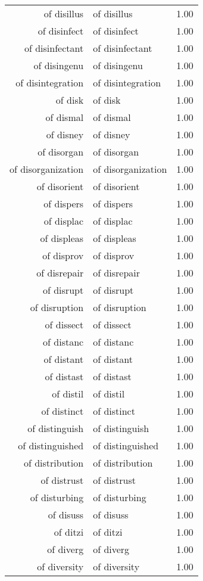 \begin{table}[ht]
\begin{tabular}{rlr}
  of disillus & of disillus & 1.00 \\ 
  of disinfect & of disinfect & 1.00 \\ 
  of disinfectant & of disinfectant & 1.00 \\ 
  of disingenu & of disingenu & 1.00 \\ 
  of disintegration & of disintegration & 1.00 \\ 
  of disk & of disk & 1.00 \\ 
  of dismal & of dismal & 1.00 \\ 
  of disney & of disney & 1.00 \\ 
  of disorgan & of disorgan & 1.00 \\ 
  of disorganization & of disorganization & 1.00 \\ 
  of disorient & of disorient & 1.00 \\ 
  of dispers & of dispers & 1.00 \\ 
  of displac & of displac & 1.00 \\ 
  of displeas & of displeas & 1.00 \\ 
  of disprov & of disprov & 1.00 \\ 
  of disrepair & of disrepair & 1.00 \\ 
  of disrupt & of disrupt & 1.00 \\ 
  of disruption & of disruption & 1.00 \\ 
  of dissect & of dissect & 1.00 \\ 
  of distanc & of distanc & 1.00 \\ 
  of distant & of distant & 1.00 \\ 
  of distast & of distast & 1.00 \\ 
  of distil & of distil & 1.00 \\ 
  of distinct & of distinct & 1.00 \\ 
  of distinguish & of distinguish & 1.00 \\ 
  of distinguished & of distinguished & 1.00 \\ 
  of distribution & of distribution & 1.00 \\ 
  of distrust & of distrust & 1.00 \\ 
  of disturbing & of disturbing & 1.00 \\ 
  of disuss & of disuss & 1.00 \\ 
  of ditzi & of ditzi & 1.00 \\ 
  of diverg & of diverg & 1.00 \\ 
  of diversity & of diversity & 1.00 \\ 

\end{tabular}
\end{table}
